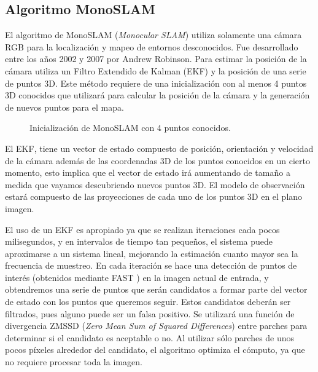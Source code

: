\subsection{Algoritmo MonoSLAM}
El algoritmo de  MonoSLAM (\textit{Monocular SLAM}) \cite{Davison2007monoslam} utiliza solamente una cámara RGB para la localización y mapeo de entornos desconocidos. Fue desarrollado entre los años 2002 y 2007  por Andrew Robinson. Para estimar la posición de la cámara utiliza un Filtro Extendido de Kalman (EKF) y la posición de una serie de puntos 3D. Este método requiere de una inicialización con al menos 4 puntos 3D conocidos que utilizará para calcular la posición de la cámara y la generación de nuevos puntos para el mapa.
\begin{figure}[H]
\begin{center}
\end{center}
\caption{Inicialización de MonoSLAM con 4 puntos conocidos.}
\end{figure}

El EKF, tiene un vector de estado compuesto de posición, orientación y velocidad de la cámara además de las coordenadas 3D de los puntos conocidos en un cierto momento, esto implica que el vector de estado irá aumentando de tamaño a medida que vayamos descubriendo nuevos puntos 3D. El modelo de observación estará compuesto de las proyecciones de cada uno de los puntos 3D en el plano imagen.

El uso de un EKF es apropiado ya que se realizan iteraciones cada pocos milisegundos, y en intervalos de tiempo tan pequeños, el sistema puede aproximarse a un sistema lineal, mejorando la estimación cuanto mayor sea la frecuencia de muestreo. En cada iteración se hace una detección de puntos de interés (obtenidos mediante FAST \cite{FastCorner98}) en la imagen actual de entrada, y obtendremos una serie de puntos que serán candidatos a formar parte del vector de estado con los puntos que queremos seguir. Estos candidatos deberán ser filtrados, pues alguno puede ser un falsa positivo. Se utilizará una función de divergencia ZMSSD (\textit{Zero Mean Sum of Squared Differences}) entre parches para determinar si el candidato es aceptable o no. Al utilizar sólo parches de unos pocos píxeles alrededor del candidato, el algoritmo optimiza el cómputo, ya que no requiere procesar toda la imagen.

